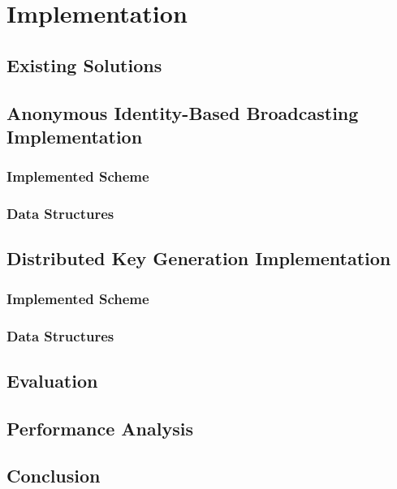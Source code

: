\chapter{Implementation}
\label{cha:n}
\lipsum[79]

\section{Existing Solutions}
\lipsum[80]

\section{Anonymous Identity-Based Broadcasting Implementation}
\lipsum[81]

\subsection{Implemented Scheme}
\lipsum[82]

\subsection{Data Structures}
\lipsum[83]

\section{Distributed Key Generation Implementation}

\subsection{Implemented Scheme}
\lipsum[83]

\subsection{Data Structures}
\lipsum[84]

\section{Evaluation}
\lipsum[86]

\section{Performance Analysis}
\lipsum[83-85]

\section{Conclusion}
\lipsum[86-88]

